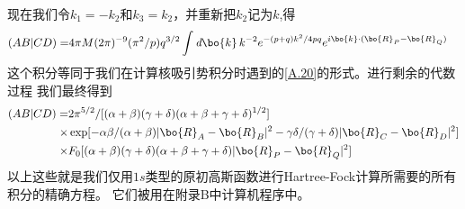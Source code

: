 现在我们令$k_1=-k_2$和$k_3=k_2$，并重新把$k_2$记为$k$,得
\begin{align}
	\label{A.40}
	(AB|CD)=&4\pi M(2\pi)^{-9}(\pi^2/p)q^{3/2}\int\emph{d}\bo{k}\,
	k^{-2}e^{-(p+q)k^2/4pq}e^{i\bo{k}\cdot(\bo{R}_P-\bo{R}_Q)}
\end{align}
这个积分等同于我们在计算核吸引势积分时遇到的\autoref{A.20}的形式。进行剩余的代数过程
我们最终得到
\begin{align}
	\label{A.41}
	(AB|CD)=&2\pi ^{5/2}/[(\alpha+\beta)(\gamma+\delta)(\alpha+\beta+\gamma+\delta)^{1/2}]
	\nonumber\\
	\times&\exp[-\alpha\beta/(\alpha+\beta)|\bo{R}_A-\bo{R}_B|^2-\gamma\delta/(\gamma+\delta)|\bo{R}_C-\bo{R}_D|^2]
	\nonumber\\
	\times&F_0[(\alpha+\beta)(\gamma+\delta)(\alpha+\beta+\gamma+\delta)|\bo{R}_P-\bo{R}_Q|^2]
\end{align}
以上这些就是我们仅用$1s$类型的原初高斯函数进行Hartree-Fock计算所需要的所有积分的精确方程。
它们被用在附录B中计算机程序中。

\newpage
\theendnotes
{}
